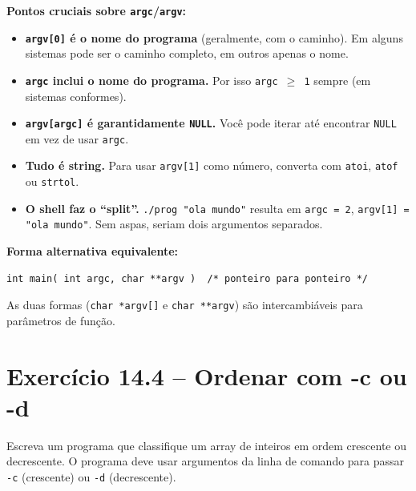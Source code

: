 \documentclass[12pt,a4paper]{article}
\begin{document}
\begin{atencao}
\textbf{Pontos cruciais sobre \texttt{argc}/\texttt{argv}:}

\begin{itemize}[noitemsep]
  \item \textbf{\texttt{argv[0]} é o nome do programa} (geralmente, com o caminho).
  Em alguns sistemas pode ser o caminho completo, em outros apenas o nome.

  \item \textbf{\texttt{argc} inclui o nome do programa.} Por isso \texttt{argc \(\geq\) 1}
  sempre (em sistemas conformes).

  \item \textbf{\texttt{argv[argc]} é garantidamente \texttt{NULL}.} Você pode
  iterar até encontrar \texttt{NULL} em vez de usar \texttt{argc}.

  \item \textbf{Tudo é string.} Para usar \texttt{argv[1]} como número, converta
  com \texttt{atoi}, \texttt{atof} ou \texttt{strtol}.

  \item \textbf{O shell faz o ``split''.} \texttt{./prog "ola mundo"} resulta em
  \texttt{argc = 2}, \texttt{argv[1] = "ola mundo"}. Sem aspas, seriam dois
  argumentos separados.
\end{itemize}

\textbf{Forma alternativa equivalente:}
\begin{lstlisting}
int main( int argc, char **argv )  /* ponteiro para ponteiro */
\end{lstlisting}
As duas formas (\texttt{char *argv[]} e \texttt{char **argv}) são intercambiáveis
para parâmetros de função.
\end{atencao}

\newpage

\section{Exercício 14.4 -- Ordenar com -c ou -d}

\begin{enunciadoBox}[Enunciado 14.4]
Escreva um programa que classifique um array de inteiros em ordem crescente
ou decrescente. O programa deve usar argumentos da linha de comando para
passar \texttt{-c} (crescente) ou \texttt{-d} (decrescente).
\end{enunciadoBox}
\end{document}
